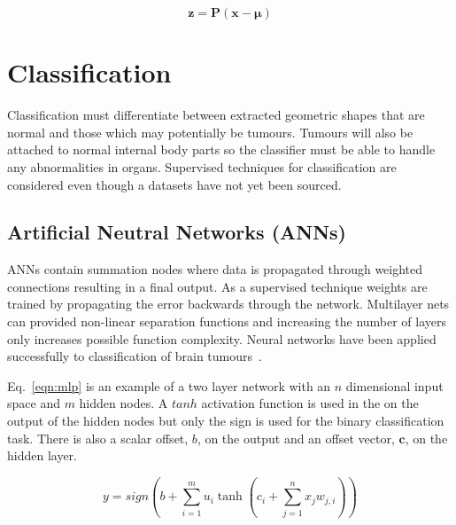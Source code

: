\documentclass[journal]{IEEEtran}
\begin{document}
\begin{equation}
	\boldsymbol{z} = \boldsymbol{P}(\boldsymbol{x} - \boldsymbol{\mu})
	\label{eqn:PCA}
\end{equation}












\section{Classification}
\label{sec:class}

Classification must differentiate between extracted geometric shapes that are normal and those which may potentially be tumours.
Tumours will also be attached to normal internal body parts so the classifier must be able to handle any abnormalities in organs.
Supervised techniques for classification are considered even though a datasets have not yet been sourced.



\subsection{Artificial Neutral Networks (ANNs)}
ANNs contain summation nodes where data is propagated through weighted connections resulting in a final output. 
As a supervised technique weights are trained by propagating the error backwards through the network.
Multilayer nets can provided non-linear separation functions and increasing the number of layers only increases possible function complexity.
Neural networks have been applied successfully to classification of brain tumours~\cite{amin12brain}.

Eq.~\eqref{eqn:mlp} is an example of a two layer network with an $n$ dimensional input space and $m$ hidden nodes.
A $tanh$ activation function is used in the on the output of the hidden nodes but only the sign is used for the binary classification task.
There is also a scalar offset, $b$, on the output and an offset vector, $\mathbf{c}$, on the hidden layer. 

\begin{equation}
	y = sign \left(b + \sum_{i=1}^{m} u_i \tanh \left(c_i + \sum_{j=1}^{n} x_j w_{j,i}\right)  \right) 
	\label{eqn:mlp}
\end{equation}
\end{document}
